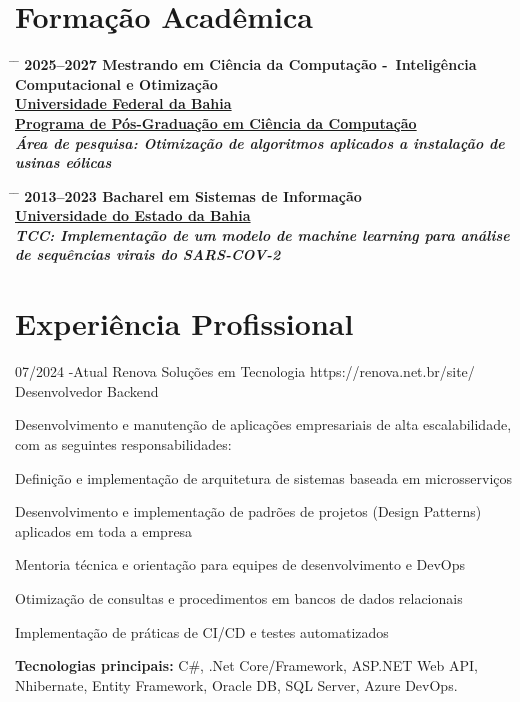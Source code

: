 \documentclass{article}
\begin{document}
\section*{Formação Acadêmica}

\begin{tabbing}
	\hspace{2cm} \= \hspace{4cm} \= \kill
	\bf{2025--2027} \> Mestrando em Ciência da Computação -\ Inteligência Computacional e Otimização \\
	\href{https://www.ufba.br/}{Universidade Federal da Bahia} \\
	\href{https://pgcomp.ufba.br/}{Programa de Pós-Graduação em Ciência da Computação} \\
	\> \textit{Área de pesquisa: Otimização de algoritmos aplicados a instalação de usinas eólicas} \\
\end{tabbing}

\begin{tabbing}
	\hspace{2cm} \= \hspace{4cm} \= \kill
	\bf{2013--2023} \> Bacharel em Sistemas de Informação \\
	\href{https://portal.uneb.br/}{Universidade do Estado da Bahia} \\
	\> \textit{{TCC}: Implementação de um modelo de machine learning para análise} \\
	\> \textit{de sequências virais do SARS-COV-2} \\
\end{tabbing}

\section*{Experiência Profissional}

\begin{job}
{07/2024 -}{Atual}
{Renova Soluções em Tecnologia}
{https://renova.net.br/site/}
{Desenvolvedor Backend}%
{Desenvolvimento e manutenção de aplicações empresariais de alta escalabilidade, com as seguintes responsabilidades:
	\begin{itemize-noindent}
	\item Definição e implementação de arquitetura de sistemas baseada em microsserviços
	\item Desenvolvimento e implementação de padrões de projetos (Design Patterns) aplicados em toda a empresa
	\item Mentoria técnica e orientação para equipes de desenvolvimento e DevOps
	\item Otimização de consultas e procedimentos em bancos de dados relacionais
	\item Implementação de práticas de CI/CD e testes automatizados
	\end{itemize-noindent}
	\rule{0mm}{5mm}\textbf{Tecnologias principais:} C\#, {.Net Core}/Framework, ASP.NET Web API, Nhibernate, Entity Framework, Oracle DB, SQL Server, Azure DevOps.}
\end{job}
\end{document}
